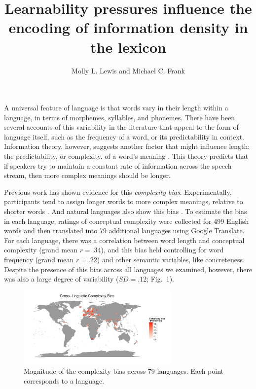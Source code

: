 \documentclass{evolang11}
\begin{document}
\title{Learnability pressures influence the encoding of information density in the lexicon}

\author{Molly L. Lewis and Michael C. Frank}

\address{Psychology Department, Stanford University \\ Stanford, CA, USA \\mll@stanford.edu, mcfrank@stanford.edu}  

\maketitle



A universal feature of language is that words vary in their length within a language, in terms of morphemes, syllables, and phonemes. There have been several accounts of this variability in the literature that appeal to the form of language itself, such as the frequency of a word, or its predictability in context. Information theory, however, suggests another  factor that might influence length: the predictability, or complexity, of a word's meaning \cite{frank2008speaking}. This theory predicts that if speakers try to maintain a constant rate of information  across the speech stream, then more complex meanings should be longer. 

Previous work has shown evidence for this {\it complexity bias}. Experimentally, participants tend to assign longer words to more complex meanings, relative to shorter words \cite{lewisstructure2014}. And natural languages also show this bias \cite{lewisFrankUR}. To estimate the bias in each language, ratings of conceptual complexity were collected for 499 English words and then translated into 79 additional languages using Google Translate. For each language, there was a correlation between word length and conceptual complexity (grand mean $r =  .34$), and this bias held controlling for word frequency (grand mean $r = .22$) and other semantic variables, like concreteness. Despite the presence of this bias across all languages we examined, however, there was also a large degree of variability ($SD = .12$;  Fig.\ 1). 

 
\begin{figure}
\includegraphics[width=3.1in]{Fig1.pdf}
\caption{Magnitude of the complexity bias across 79 languages. Each point corresponds to a language. \label{fig1}}
\end{figure}
\end{document}
